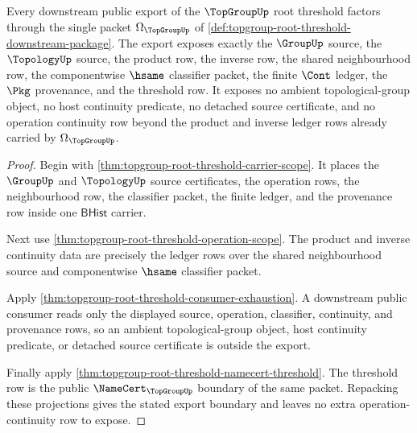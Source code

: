 \begin{theorem}
\label{thm:topgroup-root-threshold-export-boundary}
Every downstream public export of the $\TopGroupUp$ root threshold factors
through the single packet $\Omega_{\TopGroupUp}$ of
\autoref{def:topgroup-root-threshold-downstream-package}. The export exposes
exactly the $\GroupUp$ source, the $\TopologyUp$ source, the product row, the
inverse row, the shared neighbourhood row, the componentwise $\hsame$
classifier packet, the finite $\Cont$ ledger, the $\Pkg$ provenance, and the
threshold row. It exposes no ambient topological-group object, no host
continuity predicate, no detached source certificate, and no operation
continuity row beyond the product and inverse ledger rows already carried by
$\Omega_{\TopGroupUp}$.
\end{theorem}
\begin{proof}
Begin with \autoref{thm:topgroup-root-threshold-carrier-scope}. It places the
$\GroupUp$ and $\TopologyUp$ source certificates, the operation rows, the
neighbourhood row, the classifier packet, the finite ledger, and the provenance
row inside one $\mathsf{BHist}$ carrier.

Next use \autoref{thm:topgroup-root-threshold-operation-scope}. The product
and inverse continuity data are precisely the ledger rows over the shared
neighbourhood source and componentwise $\hsame$ classifier packet.

Apply \autoref{thm:topgroup-root-threshold-consumer-exhaustion}. A downstream
public consumer reads only the displayed source, operation, classifier,
continuity, and provenance rows, so an ambient topological-group object, host
continuity predicate, or detached source certificate is outside the export.

Finally apply \autoref{thm:topgroup-root-threshold-namecert-threshold}. The
threshold row is the public $\NameCert_{\TopGroupUp}$ boundary of the same
packet. Repacking these projections gives the stated export boundary and leaves
no extra operation-continuity row to expose.
\end{proof}
